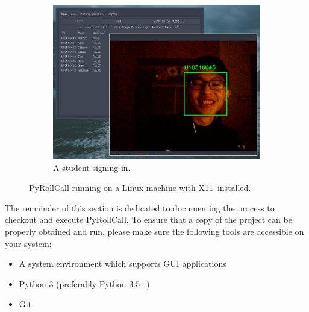 \begin{figure}[!htb]
\begin{subfigure}[b]{0.32\linewidth}
    \includegraphics[width=\linewidth]{figures/preview3.eps}
    \caption{A student signing in.}
  \end{subfigure}
  \caption{PyRollCall running on a Linux machine with X11\protect\footnotemark \ installed.}
  \label{fig:systemAppearance}
\end{figure}


\vspace{0.5cm}
The remainder of this section is dedicated to documenting the process to checkout and
execute PyRollCall. To ensure that a copy of the project can be properly obtained and
run, please make sure the following tools are accessible on your system:
\vspace{0.5cm}

\begin{itemize}
  \item A system environment which supports GUI applications
  \item Python 3 (preferably Python 3.5+)
  \item Git
 \end{itemize}
\setstretch{\myContentLineSpacing}
\vspace{0.1cm}



